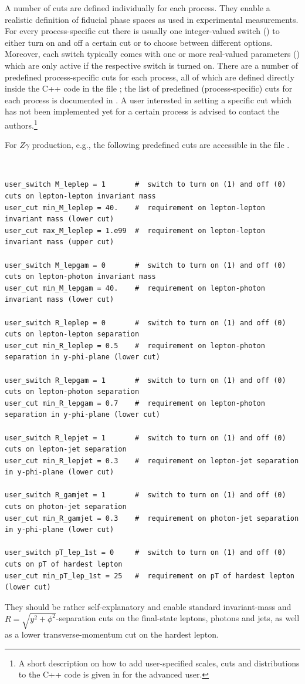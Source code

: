 \documentclass[english,11pt]{article}
\begin{document}
A number of cuts are defined individually for each process. They enable a realistic definition of fiducial phase spaces as
used in experimental measurements. For every process-specific cut there is usually one integer-valued switch
() to either turn on and off a certain cut or to choose between different options. Moreover, each switch typically comes with one or more 
real-valued parameters () which are only active if the respective switch is turned on. There are a number of predefined 
process-specific cuts for each process, all of which are defined directly inside the C++ code in the file 
\Matrixversion{}; the list of predefined (process-specific) cuts for each 
process is documented in . A user interested in setting a specific cut which has not been implemented yet for a 
certain process is advised to contact the authors.\footnote{A short description on how to
add user-specified scales, cuts and distributions to the C++ code is given in  for the advanced user.}

For $Z\gamma$ production, e.g., the following predefined cuts are accessible in the file .
{\tt
\begin{lstlisting}
user_switch M_leplep = 1       #  switch to turn on (1) and off (0) cuts on lepton-lepton invariant mass
user_cut min_M_leplep = 40.    #  requirement on lepton-lepton invariant mass (lower cut)
user_cut max_M_leplep = 1.e99  #  requirement on lepton-lepton invariant mass (upper cut)

user_switch M_lepgam = 0       #  switch to turn on (1) and off (0) cuts on lepton-photon invariant mass
user_cut min_M_lepgam = 40.    #  requirement on lepton-photon invariant mass (lower cut)

user_switch R_leplep = 0       #  switch to turn on (1) and off (0) cuts on lepton-lepton separation
user_cut min_R_leplep = 0.5    #  requirement on lepton-photon separation in y-phi-plane (lower cut)

user_switch R_lepgam = 1       #  switch to turn on (1) and off (0) cuts on lepton-photon separation
user_cut min_R_lepgam = 0.7    #  requirement on lepton-photon separation in y-phi-plane (lower cut)

user_switch R_lepjet = 1       #  switch to turn on (1) and off (0) cuts on lepton-jet separation
user_cut min_R_lepjet = 0.3    #  requirement on lepton-jet separation in y-phi-plane (lower cut)

user_switch R_gamjet = 1       #  switch to turn on (1) and off (0) cuts on photon-jet separation
user_cut min_R_gamjet = 0.3    #  requirement on photon-jet separation in y-phi-plane (lower cut)

user_switch pT_lep_1st = 0     #  switch to turn on (1) and off (0) cuts on pT of hardest lepton
user_cut min_pT_lep_1st = 25   #  requirement on pT of hardest lepton (lower cut)
\end{lstlisting}
}
They should be rather self-explanatory and enable standard invariant-mass and $R=\sqrt{y^2+\phi^2}$-separation cuts 
on the final-state leptons, photons and jets, as well as a lower transverse-momentum cut on the hardest lepton.
\end{document}
